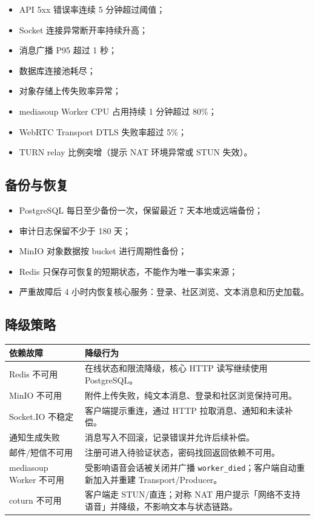 \begin{itemize}
  \item API 5xx 错误率连续 5 分钟超过阈值；
  \item Socket 连接异常断开率持续升高；
  \item 消息广播 P95 超过 1 秒；
  \item 数据库连接池耗尽；
  \item 对象存储上传失败率异常；
  \item mediasoup Worker CPU 占用持续 1 分钟超过 80\%；
  \item WebRTC Transport DTLS 失败率超过 5\%；
  \item TURN relay 比例突增（提示 NAT 环境异常或 STUN 失效）。
\end{itemize}

\subsection{备份与恢复}

\begin{itemize}
  \item PostgreSQL 每日至少备份一次，保留最近 7 天本地或远端备份；
  \item 审计日志保留不少于 180 天；
  \item MinIO 对象数据按 bucket 进行周期性备份；
  \item Redis 只保存可恢复的短期状态，不能作为唯一事实来源；
  \item 严重故障后 4 小时内恢复核心服务：登录、社区浏览、文本消息和历史加载。
\end{itemize}

\subsection{降级策略}

\noindent\begin{tabularx}{\textwidth}{L{3.6cm}Y}
  \toprule
  依赖故障 & 降级行为 \\
  \midrule
  Redis 不可用 & 在线状态和限流降级，核心 HTTP 读写继续使用 PostgreSQL。 \\
  MinIO 不可用 & 附件上传失败，纯文本消息、登录和社区浏览保持可用。 \\
  Socket.IO 不稳定 & 客户端提示重连，通过 HTTP 拉取消息、通知和未读补偿。 \\
  通知生成失败 & 消息写入不回滚，记录错误并允许后续补偿。 \\
  邮件/短信不可用 & 注册可进入待验证状态，密码找回返回依赖不可用。 \\
  mediasoup Worker 不可用 & 受影响语音会话被关闭并广播 \texttt{worker\_died}；客户端自动重新加入并重建 Transport/Producer。 \\
  coturn 不可用 & 客户端走 STUN/直连；对称 NAT 用户提示「网络不支持语音」并降级，不影响文本与状态链路。 \\
  \bottomrule
\end{tabularx}

